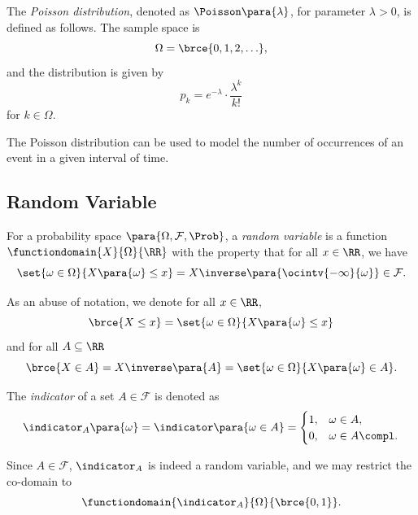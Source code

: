 \begin{definition}
    \label{def:poisson-distribution}%
    The \emph{Poisson distribution}, denoted as \(\Poisson\para{\lambda}\), for parameter \(\lambda > 0\), is defined as follows. The sample space is
    \[
        \Omega = \brce{0, 1, 2, \ldots},
    \]
    and the distribution is given by
    \[
        p_k = e^{-\lambda} \cdot \frac{\lambda^k}{k!}
    \]
    for \(k \in \Omega\).
\end{definition}

The Poisson distribution can be used to model the number of occurrences of an event in a given interval of time.

\subsection{Random Variable}

\begin{definition}
    \label{def:random-variable}%
    For a probability space \(\para{\Omega, \mathcal{F}, \Prob}\), a \emph{random variable} is a function \(\functiondomain{X}{\Omega}{\RR}\) with the property that for all \(x \in \RR\), we have
    \[
        \set{\omega \in \Omega}{X\para{\omega} \leq x} = X\inverse \para{\ocintv{-\infty}{\omega}} \in \mathcal{F}.
    \]
\end{definition}

\begin{notation}
    As an abuse of notation, we denote for all \(x \in \RR\),
    \[
        \brce{X \leq x} = \set{\omega \in \Omega}{X\para{\omega} \leq x}
    \]
    and for all \(A \subseteq \RR\)
    \[
        \brce{X \in A} = X\inverse\para{A} = \set{\omega \in \Omega}{X\para{\omega} \in A}.
    \]
\end{notation}

\begin{definition}
    \label{def:indicator-random-variable}%
    The \emph{indicator} of a set \(A \in \mathcal{F}\) is denoted as
    \[
        \indicator_{A} \para{\omega} = \indicator\para{\omega \in A} = \begin{cases}
            1, & \omega \in A, \\ 0, & \omega \in A\compl.
        \end{cases}
    \]

    Since \(A \in \mathcal{F}\), \(\indicator_{A}\) is indeed a random variable, and we may restrict the co-domain to
    \[
        \functiondomain{\indicator_{A}}{\Omega}{\brce{0, 1}}.
    \]
\end{definition}


